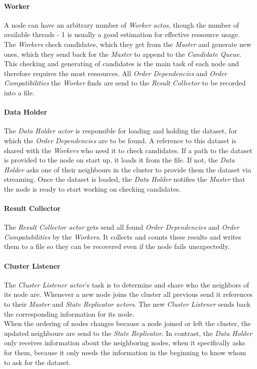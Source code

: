 \paragraph{Worker}
A node can have an arbitrary number of \emph{Worker actos}, though the number of available threads - 1 is usually a good estimation for effective ressource usage.
The \emph{Workers} check candidates, which they get from the \emph{Master} and generate new ones, which they send back for the \emph{Master} to append to the \emph{Candidate Queue}.
This checking and generating of candidates is the main task of each node and therefore requires the most ressources.
All \emph{Order Dependencies} and \emph{Order Compatibilities} the \emph{Worker} finds are send to the \emph{Result Collector} to be recorded into a file. 

\paragraph{Data Holder}
The \emph{Data Holder actor} is responsible for loading and holding the dataset, for which the \emph{Order Dependencies} are to be found. 
A reference to this dataset is shared with the \emph{Workers} who need it to check candidates.
If a path to the dataset is provided to the node on start up, it loads it from the file.
If not, the \emph{Data Holder} asks one of their neighbours in the cluster to provide them the dataset via streaming.
Once the dataset is loaded, the \emph{Data Holder} notifies the \emph{Master} that the node is ready to start working on checking candidates. 

\paragraph{Result Collector}
The \emph{Result Collector actor} gets send all found \emph{Order Dependencies} and \emph{Order Compatabilities} by the \emph{Workers}.
It collects and counts these results and writes them to a file so they can be recovered even if the node fails unexpectedly. 

\paragraph{Cluster Listener}
The \emph{Cluster Listener actor}'s task is to determine and share who the neighbors of its node are.
Whenever a new node joins the cluster all previous send it references to their \emph{Master} and \emph{State Replicator actors}.
The new \emph{Cluster Listener} sends back the corresponding information for its node. \\
When the ordering of nodes changes because a node joined or left the cluster, the updated neighbours are send to the \emph{State Replicator}.
In contrast, the \emph{Data Holder} only receives information about the neighboring nodes, when it specifically asks for them, because it only needs the information in the beginning to know whom to ask for the dataset.


